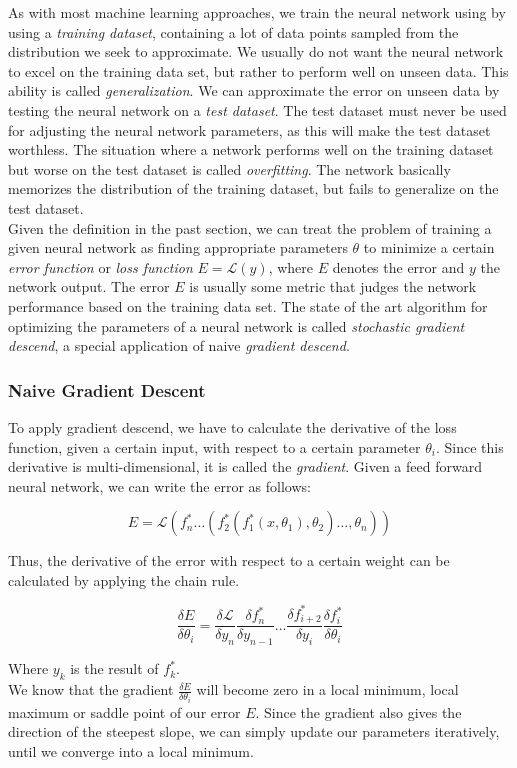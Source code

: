 As with most machine learning approaches, we train the neural  network using by using a \textit{training dataset}, containing a lot of data points sampled from the distribution we seek to approximate. We usually do not want the neural network to excel on the training data set, but rather to perform well on unseen data. This ability is called \textit{generalization}. We can approximate the error on unseen data by testing the neural network on a \textit{test dataset}. The test dataset must never be used for adjusting the neural network parameters, as this will make the test dataset worthless. The situation where a network performs well on the training dataset but worse on the test dataset is called \textit{overfitting}. The network basically memorizes the distribution of the training dataset, but fails to generalize on the test dataset. \\
Given the definition in the past section, we can treat the problem of training a given neural network as finding appropriate parameters $\theta$ to minimize a certain \textit{error function} or \textit{loss function} $E = \mathcal{L}(y)$, where $E$ denotes the error and $y$ the network output. The error $E$ is usually some metric that judges the network performance based on the training data set. The state of the art algorithm for optimizing the parameters of a neural network is called \textit{stochastic gradient descend}, a special application of naive \textit{gradient descend}.
\subsubsection{Naive Gradient Descent}
\label{sec:gradient_descend}
To apply gradient descend, we have to calculate the derivative of the loss function, given a certain input, with respect to a certain parameter $\theta_i$. Since this derivative is multi-dimensional, it is called the \textit{gradient}. Given a feed forward neural network, we can write the error as follows:

\[
E = \mathcal{L}(f^*_n \dots (f^*_2(f^*_1(x, \theta_1), \theta_2) \dots, \theta_n))
\]

Thus, the derivative of the error with respect to a certain weight can be calculated by applying the chain rule.  

\[
\frac{\delta E}{\delta \theta_i} = 
	\frac{\delta \mathcal{L}}{\delta y_n}
	\frac{\delta f^*_n}{\delta y_{n - 1}}
	\dots
	\frac{\delta f^*_{i + 2}}{\delta y_i}
	\frac{\delta f^*_i}{\delta \theta_i}
\]

Where $y_k$ is the result of $f^*_k$. \\
We know that the gradient $\frac{\delta E}{\delta \theta_i}$ will become zero in a local minimum, local maximum or saddle point of our error $E$. Since the gradient also gives the direction of the steepest slope, we can simply update our parameters iteratively, until we converge into a local minimum.

